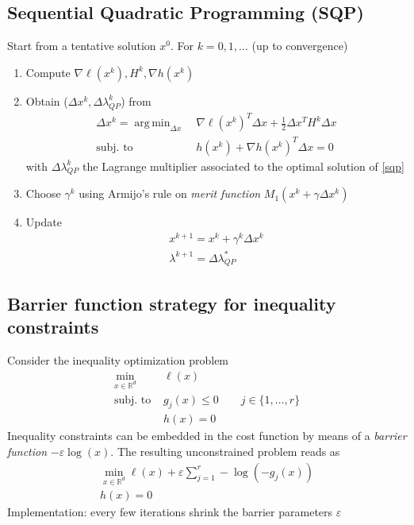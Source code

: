 \documentclass[openany]{book}
\DeclareMathOperator*{\argmin}{arg\,min} %
\newcommand{\R}{\mathbb{R}} %
\theoremstyle{definition}
\theoremstyle{remark}
\begin{document}
\subsection{Sequential Quadratic Programming (SQP)}
Start from a tentative solution $x^0$. For $k=0,1,\dots$ (up to convergence)
\begin{enumerate}
    \item Compute $\nabla\ell(x^k),H^k,\nabla h(x^k)$ 
    \item Obtain ($\Delta x^k, \Delta \lambda^k_{QP}$) from 
        \begin{align}\label{sqp}
                \Delta x^k = \argmin_{\Delta x}\  & \nabla \ell(x^k)^T\Delta x +\displaystyle\frac{1}{2}\Delta x^TH^k \Delta x \\
                \text{subj. to }\  & h(x^k) + \nabla h(x^k)^T \Delta x = 0
        \end{align}
        with $\Delta\lambda^k_{QP}$ the Lagrange multiplier associated to the optimal solution of \eqref{sqp}
    \item Choose $\gamma^k$ using Armijo's rule on \emph{merit function} $M_1(x^k+\gamma\Delta x^k)$
    \item Update 
        \begin{gather*}
            x^{k+1} = x^k+ \gamma^k\Delta x^k \\
            \lambda^{k+1} = \Delta \lambda^*_{QP}
        \end{gather*}
\end{enumerate}

\subsection{Barrier function strategy for inequality constraints}
Consider the inequality optimization problem 
\begin{align*}
    \min_{x\in\R^d} & \ell(x) \\
    \text{subj. to } & g_j(x) \leq 0 \qquad j\in\{1,\dots,r\}\\
    & h(x) = 0
\end{align*}
Inequality constraints can be embedded in the cost function by means of a \emph{barrier function} $-\varepsilon \log(x)$. The resulting unconstrained problem reads as 
\begin{gather*}
    \min_{x\in\R^d}\ell(x) + \varepsilon\displaystyle\sum_{j=1}^{r}-\log(-g_j(x)) \\
    h(x) = 0
\end{gather*}
Implementation: every few iterations shrink the barrier parameters $\varepsilon$
\end{document}

